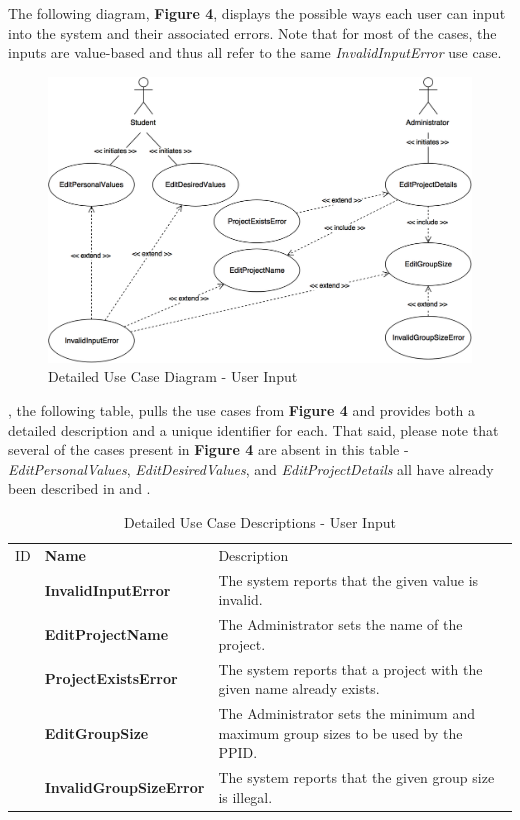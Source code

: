\documentclass[12pt,letterpaper]{article}
\begin{document}
The following diagram, {\bf Figure 4}, displays the possible ways each user can input into the system and their associated errors. Note that for most of the cases, the inputs are value-based and thus
all refer to the same {\it InvalidInputError} use case.

\begin{figure}[H]
	\centering{}
	\includegraphics[scale=0.3]{imgs/detailed-user-input-use-case-diagram.png}
	\caption{Detailed Use Case Diagram - User Input}
\end{figure}

, the following table, pulls the use cases from {\bf Figure 4} and provides both a detailed description and a unique identifier for each. That said, please note that several of the cases present in {\bf Figure 4}
are absent in this table - {\it EditPersonalValues}, {\it EditDesiredValues}, and {\it EditProjectDetails} all have already been described in  and .

\begin{table}[H]
	\caption{Detailed Use Case Descriptions - User Input}
	\begin{tabu} to 
	    \tableheader{}ID & Name & Description\\
		\invalidinputerror{} & InvalidInputError & The system reports that the given value is invalid.\\
		\editprojectname{} & EditProjectName & The Administrator sets the name of the project. \\
		\projectexistserror{} & ProjectExistsError & The system reports that a project with the given name already exists.\\
		\editgroupsize{} & EditGroupSize & The Administrator sets the minimum and maximum group sizes to be used by the PPID. \\
		\invalidgroupsizeerror{} & InvalidGroupSizeError & The system reports that the given group size is illegal.\\
	\end{tabu}
\end{table}
\end{document}
